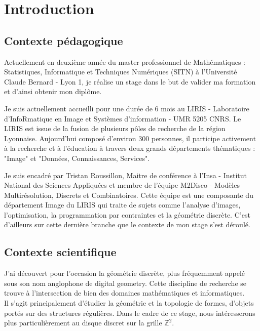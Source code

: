 \section{Introduction}

\subsection{Contexte pédagogique}

Actuellement en deuxième année du master professionnel de Mathématiques : Statistiques, Informatique et Techniques Numériques (SITN) à l’Université Claude Bernard - Lyon 1, je réalise un stage dans le but de valider ma formation et d'ainsi obtenir mon diplôme. \newline

Je suis actuellement accueilli pour une durée de 6 mois au LIRIS - Laboratoire d'InfoRmatique en Image et Systèmes d'information - UMR 5205 CNRS. Le LIRIS est issue de la fusion de plusieurs pôles de recherche de la région Lyonnaise. Aujourd'hui composé d'environ 300 personnes, il participe activement à la recherche et à l'éducation à travers deux grands départements thématiques : "Image" et "Données, Connaissances, Services".\newline

Je suis encadré par Tristan Roussillon, Maitre de conférence à l'Insa - Institut National des Sciences Appliquées et membre de l'équipe M2Disco - Modèles Multirésolution, Discrets et Combinatoires. Cette équipe est une composante du département Image du LIRIS qui traite de sujets comme l'analyse d'images, l'optimisation, la programmation par contraintes et la géométrie discrète. C'est d'ailleurs sur cette dernière branche que le contexte de mon stage s'est déroulé.



\subsection{Contexte scientifique}

J'ai découvert pour l’occasion la géométrie discrète, plus fréquemment appelé sous son nom anglophone de digital geometry. Cette discipline de recherche se trouve à l'intersection de bien des domaines mathématiques et informatiques.\\

   
Il s'agit principalement d'étudier la géométrie et la topologie de formes, d'objets portés sur des structures régulières. Dans le cadre de ce stage, nous intéresserons plus particulièrement au disque discret sur la grille $\mathbb{Z}^{2}$. 

